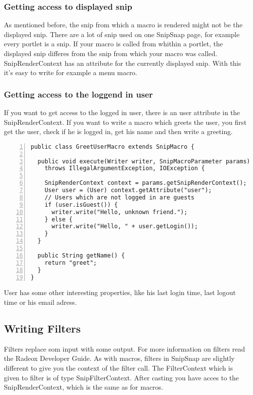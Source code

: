 \documentclass[a4paper,pdftex]{article}
\begin{document}
\subsubsection{Getting access to displayed snip}

As mentioned before, the snip from which a macro is rendered might not
be the displayed snip. There are a lot of snip used on one SnipSnap page, 
for example every portlet is a snip. If your macro is called from whithin a
portlet, the displayed snip differes from the snip from which your macro
was called. SnipRenderContext has an attribute for the currently displayed
snip. With this it's easy to write for example a menu macro.

\subsubsection{Getting access to the loggend in user}

If you want to get access to the logged in user, there is an user attribute
in the SnipRenderContext. If you want to write a macro which greets the user,
you first get the user, check if he is logged in, get his name and then write
a greeting.

\begin{Verbatim}[gobble=0,frame=single,numbers=left,fontsize=\small]
public class GreetUserMacro extends SnipMacro {

  public void execute(Writer writer, SnipMacroParameter params)
    throws IllegalArgumentException, IOException {

    SnipRenderContext context = params.getSnipRenderContext();
    User user = (User) context.getAttribute("user");
    // Users which are not logged in are guests
    if (user.isGuest()) {
      writer.write("Hello, unknown friend.");
    } else {
      writer.write("Hello, " + user.getLogin());
    }
  }

  public String getName() {
    return "greet";
  }
}
\end{Verbatim}

User has some other interesting properties, like his last login time, last logout time or
his email adress.

\subsection{Writing Filters}

Filters replace som input with some output. For more information on filters
read the Radeox Developer Guide\cite{RadeoxDeveloper}. As with macros,
filters in SnipSnap are slightly different to give you the context of the filter
call. The FilterContext which is given to filter is of type SnipFilterContext.
After casting you have acces to the SnipRenderContext, which is the same
as for macros.
\end{document}
